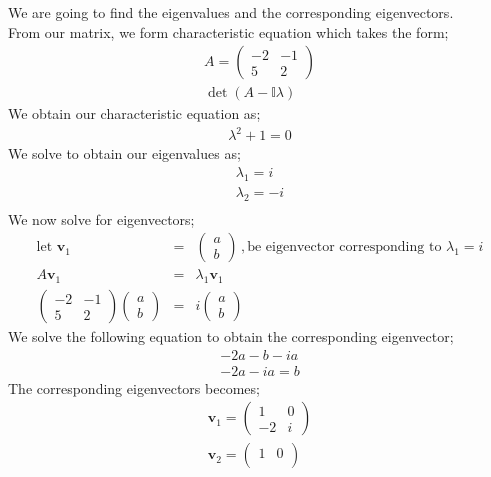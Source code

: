 \documentclass[12pt,a4paper]{article}
\begin{document}
\begin{enumerate}
We are going to find the eigenvalues and the corresponding eigenvectors.\\
From our matrix, we form characteristic equation which takes the form;
\begin{eqnarray*}
A=\begin{pmatrix}
-2 & -1\\
5& 2
\end{pmatrix}\\
\det (A-\mathbb{I} \lambda)
\end{eqnarray*} 
We obtain our characteristic equation as;
\begin{eqnarray*}
\lambda^2 +1 =0
\end{eqnarray*}
We solve to obtain our eigenvalues as;
\begin{eqnarray*}
\lambda_1=i\\
\lambda_2=-i\\
\end{eqnarray*}
We now solve for eigenvectors;
\begin{eqnarray*}
\text{let}\,\,  \textbf{v}_1&=&\begin{pmatrix}
a \\
b
\end{pmatrix} \,, \text{be eigenvector corresponding to } \lambda_1=i\\
A\textbf{v}_1&=&\lambda _1\textbf{v}_1 \\
\begin{pmatrix}
-2&-1 \\
5&2
\end{pmatrix}
\begin{pmatrix}
a \\
b
\end{pmatrix}&=&i
\begin{pmatrix}
a \\
b
\end{pmatrix}
\end{eqnarray*}
We solve the following equation to obtain the corresponding eigenvector;
\begin{eqnarray*}
-2a-b-ia\\
-2a-ia=b
\end{eqnarray*}
The corresponding eigenvectors becomes;
\begin{eqnarray*}
\textbf{v}_1=\begin{pmatrix}
1&0\\
-2&i
\end{pmatrix}\\
\textbf{v}_2=\begin{pmatrix}
1&0\\

\end{pmatrix}
\end{eqnarray*}
\end{enumerate}
\end{document}
